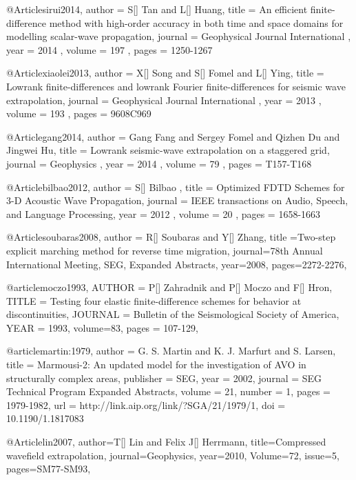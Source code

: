 @Article{sirui2014,
 author =  { S[] Tan and L[] Huang},
 title =   {An efficient finite-difference method with high-order accuracy in both time and space domains for modelling scalar-wave propagation},
 journal = { Geophysical Journal International },
 year =    { 2014 },
 volume =  { 197 },
 pages =   { 1250-1267 }
}

@Article{xiaolei2013,
 author =  { X[] Song and S[] Fomel and L[] Ying},
 title =   {Lowrank finite-differences and lowrank {F}ourier finite-differences for seismic wave extrapolation},
 journal = { Geophysical Journal International },
 year =    { 2013 },
 volume =  { 193 },
 pages =   { 960\A8C969 }
}

@Article{gang2014,
 author =  { Gang Fang and Sergey Fomel and Qizhen Du and Jingwei Hu},
 title =   {Lowrank seismic-wave extrapolation on a staggered grid},
 journal = { Geophysics },
 year =    { 2014 },
 volume =  { 79 },
 pages =   { T157-T168}
}


@Article{bilbao2012,
 author =  { S[] Bilbao },
 title =   {Optimized FDTD Schemes for 3-D Acoustic Wave Propagation},
 journal = { IEEE transactions on Audio, Speech, and Language Processing},
 year =    { 2012 },
 volume =  { 20 },
 pages =   { 1658-1663}
}

@Article{soubaras2008,
  author = {R[] Soubaras and Y[] Zhang},
  title ={Two-step explicit marching method for reverse time migration},
  journal={78th Annual International Meeting, SEG, Expanded Abstracts},
  year=2008,
  pages={2272-2276},
}

@article{moczo1993,
  AUTHOR =       {P[] Zahradnik and P[] Moczo and F[] Hron},
  TITLE =        {Testing four elastic finite-difference schemes for behavior at discontinuities},
  JOURNAL =      {Bulletin of the Seismological Society of America},
  YEAR =         {1993},
  volume=83,
  pages = {107-129},
}

@article{martin:1979,
  author =	 {G. S. Martin and K. J. Marfurt and S. Larsen},
  title =	 {Marmousi-2: An updated model for the investigation
                  of AVO in structurally complex areas},
  publisher =	 {SEG},
  year =	 2002,
  journal =	 {SEG Technical Program Expanded Abstracts},
  volume =	 21,
  number =	 1,
  pages =	 {1979-1982},
  url =		 {http://link.aip.org/link/?SGA/21/1979/1},
  doi =		 {10.1190/1.1817083}
}

@Article{lin2007,
  author={T[] Lin and Felix J[] Herrmann},
  title={Compressed wavefield extrapolation},
  journal={Geophysics},
  year=2010,
  Volume=72,
  issue=5,
  pages={SM77-SM93},
}

